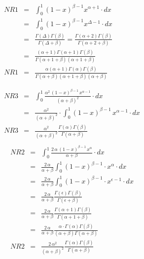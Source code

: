 \begin{uebsp}
\begin{Answer}
\begin{enumerate}[i)]
            \begin{multicols}{2}
                \begin{eqnarray*}
                    NR1 &=& \int_{0}^1(1-x)^{\beta-1} x^{\alpha+1}\cdot dx\\
                     &=& \int_{0}^1(1-x)^{\beta-1} x^{\Delta-1}\cdot dx\\
                     &=& \frac{\Gamma(\Delta)\Gamma(\beta)}{\Gamma(\Delta+\beta)} = \frac{\Gamma(\alpha+2)\Gamma(\beta)}{\Gamma(\alpha+2+\beta)}\\
                     &=& \frac{(\alpha+1)\Gamma(\alpha+1)\Gamma(\beta)}{\Gamma(\alpha+1+\beta)(\alpha+1+\beta)}\\
                    NR1 &=& \frac{\alpha(\alpha+1)\Gamma(\alpha)\Gamma(\beta)}{\Gamma(\alpha+\beta)(\alpha+1+\beta)(\alpha+\beta)}\\\\\\
                    NR3 &=& \int_{0}^1\frac{\alpha^2\,(1-x)^{\beta-1}\,x^{\alpha-1}}{(\alpha+\beta)^2}\cdot dx\\
                     &=& \frac{\alpha^2}{(\alpha+\beta)^2}\cdot \int_{0}^1 (1-x)^{\beta-1}\,x^{\alpha-1}\cdot dx\\
                    NR3 &=& \frac{\alpha^2}{(\alpha+\beta)^2} \frac{\Gamma(\alpha)\Gamma(\beta)}{\Gamma(\alpha+\beta)}\\
                \end{eqnarray*}
                \columnbreak
                \begin{eqnarray*}
                    NR2 &=& \int_{0}^1\frac{2\,\alpha\,(1-x)^{\beta-1}\,x^{\alpha}}{\alpha+\beta}\cdot dx\\
                     &=& \frac{2\,\alpha}{\alpha+\beta}\int_0^1 (1-x)^{\beta-1}\cdot x^{\alpha}\cdot dx\\
                     &=& \frac{2\,\alpha}{\alpha+\beta}\int_0^1 (1-x)^{\beta-1}\cdot x^{\epsilon-1}\cdot dx\\
                     &=& \frac{2\,\alpha}{\alpha+\beta}\frac{\Gamma(\epsilon)\Gamma(\beta)}{\Gamma(\epsilon+\beta)}\\
                     &=& \frac{2\,\alpha}{\alpha+\beta}\frac{\Gamma(\alpha+1)\Gamma(\beta)}{\Gamma(\alpha+1+\beta)}\\
                     &=& \frac{2\,\alpha}{\alpha+\beta}\frac{\alpha\cdot \Gamma(\alpha)\Gamma(\beta)}{(\alpha+\beta)\Gamma(\alpha+\beta)}\\
                    NR2 &=& \frac{2\,\alpha^2}{(\alpha+\beta)^2}\frac{\Gamma(\alpha)\Gamma(\beta)}{\Gamma(\alpha+\beta)}\\

\end{eqnarray*}
\end{multicols}
\end{enumerate}
\end{Answer}
\end{uebsp}
